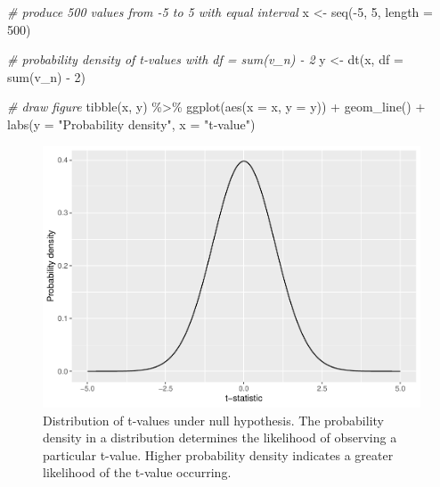 \documentclass[
]{book}
\newenvironment{Shaded}{\begin{snugshade}}{\end{snugshade}}
\newcommand{\AttributeTok}[1]{\textcolor[rgb]{0.77,0.63,0.00}{#1}}
\newcommand{\CommentTok}[1]{\textcolor[rgb]{0.56,0.35,0.01}{\textit{#1}}}
\newcommand{\DecValTok}[1]{\textcolor[rgb]{0.00,0.00,0.81}{#1}}
\newcommand{\FunctionTok}[1]{\textcolor[rgb]{0.00,0.00,0.00}{#1}}
\newcommand{\NormalTok}[1]{#1}
\newcommand{\OtherTok}[1]{\textcolor[rgb]{0.56,0.35,0.01}{#1}}
\newcommand{\SpecialCharTok}[1]{\textcolor[rgb]{0.00,0.00,0.00}{#1}}
\newcommand{\StringTok}[1]{\textcolor[rgb]{0.31,0.60,0.02}{#1}}
\begin{document}
\begin{Shaded}
\begin{Highlighting}[]
\CommentTok{\# produce 500 values from {-}5 to 5 with equal interval}
\NormalTok{x }\OtherTok{\textless{}{-}} \FunctionTok{seq}\NormalTok{(}\SpecialCharTok{{-}}\DecValTok{5}\NormalTok{, }\DecValTok{5}\NormalTok{, }\AttributeTok{length =} \DecValTok{500}\NormalTok{)}

\CommentTok{\# probability density of t{-}values with df = sum(v\_n) {-} 2}
\NormalTok{y }\OtherTok{\textless{}{-}} \FunctionTok{dt}\NormalTok{(x, }\AttributeTok{df =} \FunctionTok{sum}\NormalTok{(v\_n) }\SpecialCharTok{{-}} \DecValTok{2}\NormalTok{)}

\CommentTok{\# draw figure}
\FunctionTok{tibble}\NormalTok{(x, y) }\SpecialCharTok{\%\textgreater{}\%} 
  \FunctionTok{ggplot}\NormalTok{(}\FunctionTok{aes}\NormalTok{(}\AttributeTok{x =}\NormalTok{ x,}
             \AttributeTok{y =}\NormalTok{ y)) }\SpecialCharTok{+}
  \FunctionTok{geom\_line}\NormalTok{() }\SpecialCharTok{+}
  \FunctionTok{labs}\NormalTok{(}\AttributeTok{y =} \StringTok{"Probability density"}\NormalTok{,}
       \AttributeTok{x =} \StringTok{"t{-}value"}\NormalTok{)}
\end{Highlighting}
\end{Shaded}

\begin{figure}

{\centering \includegraphics{_main_files/figure-latex/student-t-1} 

}

\caption{Distribution of t-values under null hypothesis. The probability density in a distribution determines the likelihood of observing a particular t-value. Higher probability density indicates a greater likelihood of the t-value occurring.}\label{fig:student-t}
\end{figure}
\end{document}
